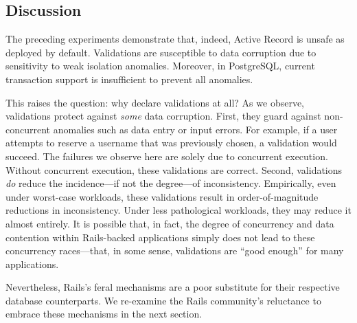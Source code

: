 \subsection{Discussion}

The preceding experiments demonstrate that, indeed, Active Record is
unsafe as deployed by default. Validations are susceptible to data
corruption due to sensitivity to weak isolation anomalies. Moreover,
in PostgreSQL, current transaction support is insufficient to prevent
all anomalies.

This raises the question: why declare validations at all? As we
observe, validations protect against \textit{some} data
corruption. First, they guard against non-concurrent anomalies such as
data entry or input errors. For example, if a user attempts to reserve
a username that was previously chosen, a validation would succeed. The
failures we observe here are solely due to concurrent
execution. Without concurrent execution, these validations are
correct. Second, validations \textit{do} reduce the incidence---if not
the degree---of inconsistency. Empirically, even under worst-case
workloads, these validations result in order-of-magnitude reductions
in inconsistency. Under less pathological workloads, they may reduce
it almost entirely. It is possible that, in fact, the degree of
concurrency and data contention within Rails-backed applications
simply does not lead to these concurrency races---that, in some sense,
validations are ``good enough'' for many applications.

Nevertheless, Rails's feral mechanisms are a poor substitute for their
respective database counterparts. We re-examine the Rails community's
reluctance to embrace these mechanisms in the next section.

